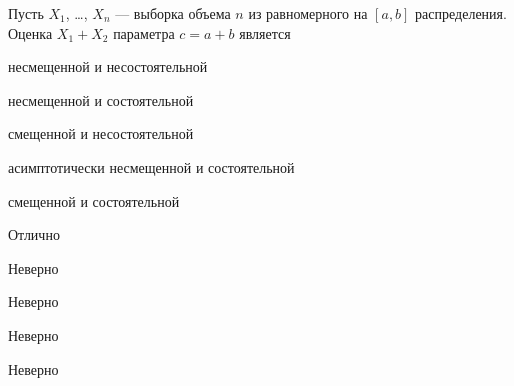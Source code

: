 
\begin{question}
Пусть \(X_1\), \ldots, \(X_n\) — выборка объема \(n\) из равномерного
на \([a, b]\) распределения. Оценка \(X_1+X_2\) параметра \(c=a+b\)
является
\begin{answerlist}
  \item несмещенной и несостоятельной
  \item несмещенной и состоятельной
  \item смещенной и несостоятельной
  \item асимптотически несмещенной и состоятельной
  \item смещенной и состоятельной
\end{answerlist}
\end{question}

\begin{solution}
\begin{answerlist}
  \item Отлично
  \item Неверно
  \item Неверно
  \item Неверно
  \item Неверно
\end{answerlist}
\end{solution}


